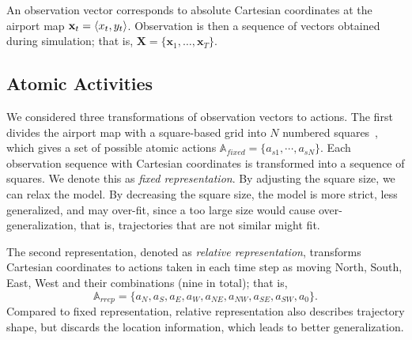 An observation vector corresponds to absolute Cartesian coordinates at the airport map $\mathbf{x}_t=\langle x_t, y_t \rangle$. Observation is then a sequence of vectors obtained during simulation; that is, $\mathbf{X} = \{\mathbf{x}_1, \dots, \mathbf{x}_T\}$.

%
%
\subsection{Atomic Activities}


We considered three transformations of observation vectors to actions. The first divides the airport map  with a square-based grid into $N$ numbered squares~\citep{Avrahami-Zilberbrand2009}, which gives a set of possible atomic actions $\mathbb{A}_{fixed}=\{a_{s1}, \cdots, a_{sN}\}$.
Each observation sequence with Cartesian coordinates is transformed into a sequence of squares. We denote this as \emph{fixed representation}. By adjusting the square size, we can relax the model. By decreasing the square size, the model is more strict, less generalized, and may over-fit, since a too large size would cause over-generalization, that is, trajectories that are not similar might fit. %

The second representation, denoted as \emph{relative representation}, transforms Cartesian coordinates to actions taken in each time step as moving North, South, East, West and their combinations (nine in total); that is, 
$$\mathbb{A}_{rrep}=\{a_N, a_S, a_E, a_W, a_{NE}, a_{NW}, a_{SE}, a_{SW}, a_0\}.$$
Compared to fixed representation, relative representation also describes trajectory shape, but discards the location information, which leads to better generalization. 

